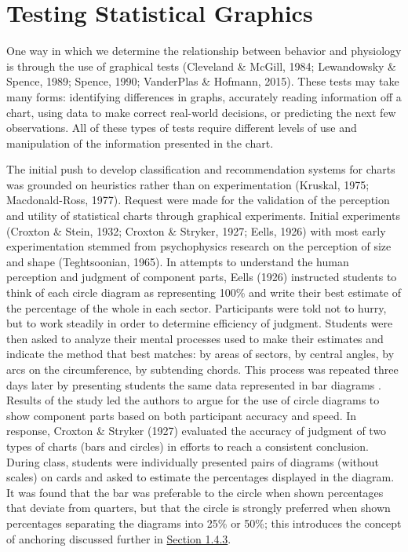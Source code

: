 \documentclass[print]{nuthesis}
\begin{document}
\hypertarget{testing-statistical-graphics}{%
\section{Testing Statistical Graphics}\label{testing-statistical-graphics}}

One way in which we determine the relationship between behavior and physiology is through the use of graphical tests (Cleveland \& McGill, 1984; Lewandowsky \& Spence, 1989; Spence, 1990; VanderPlas \& Hofmann, 2015).
These tests may take many forms: identifying differences in graphs, accurately reading information off a chart, using data to make correct real-world decisions, or predicting the next few observations.
All of these types of tests require different levels of use and manipulation of the information presented in the chart.

The initial push to develop classification and recommendation systems for charts was grounded on heuristics rather than on experimentation (Kruskal, 1975; Macdonald-Ross, 1977).
Request were made for the validation of the perception and utility of statistical charts through graphical experiments.
Initial experiments (Croxton \& Stein, 1932; Croxton \& Stryker, 1927; Eells, 1926) with most early experimentation stemmed from psychophysics research on the perception of size and shape (Teghtsoonian, 1965).
In attempts to understand the human perception and judgment of component parts, Eells (1926) instructed students to think of each circle diagram  as representing 100\% and write their best estimate of the percentage of the whole in each sector.
Participants were told not to hurry, but to work steadily in order to determine efficiency of judgment.
Students were then asked to analyze their mental processes used to make their estimates and indicate the method that best matches: by areas of sectors, by central angles, by arcs on the circumference, by subtending chords.
This process was repeated three days later by presenting students the same data represented in bar diagrams .
Results of the study led the authors to argue for the use of circle diagrams to show component parts based on both participant accuracy and speed.
In response, Croxton \& Stryker (1927) evaluated the accuracy of judgment of two types of charts (bars and circles) in efforts to reach a consistent conclusion.
During class, students were individually presented pairs of diagrams (without scales) on cards and asked to estimate the percentages displayed in the diagram.
It was found that the bar was preferable to the circle when shown percentages that deviate from quarters, but that the circle is strongly preferred when shown percentages separating the diagrams into 25\% or 50\%; this introduces the concept of anchoring discussed further in \protect\hyperlink{estimation-biases}{Section 1.4.3}.
\end{document}
